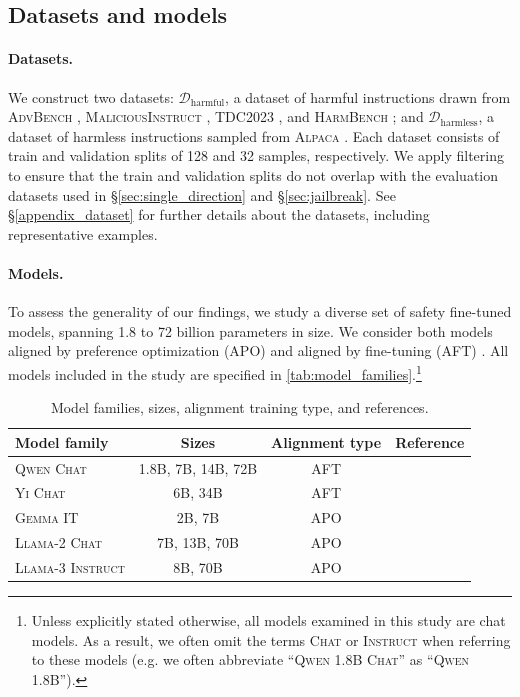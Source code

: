 \documentclass{article}
\begin{document}
\subsection{Datasets and models}
\label{subsec:datasets_models}

\paragraph{Datasets.} We construct two datasets: $\mathcal{D}_{\text{harmful}}$, a dataset of harmful instructions drawn from \textsc{AdvBench} \citep{zou2023universal}, \textsc{MaliciousInstruct} \citep{huang2023catastrophic}, \textsc{TDC2023} \citep{mazeika2024harmbench, tdc2023}, and \textsc{HarmBench} \citep{mazeika2024harmbench}; and $\mathcal{D}_{\text{harmless}}$, a dataset of harmless instructions sampled from \textsc{Alpaca} \citep{alpaca}. Each dataset consists of train and validation splits of 128 and 32 samples, respectively.
We apply filtering to ensure that the train and validation splits do not overlap with the evaluation datasets used in \S\ref{sec:single_direction} and \S\ref{sec:jailbreak}. See \S\ref{appendix_dataset} for further details about the datasets, including representative examples.

\paragraph{Models.} To assess the generality of our findings, we study a diverse set of safety fine-tuned models, spanning 1.8 to 72 billion parameters in size. We consider both models aligned by preference optimization (APO) and aligned by fine-tuning (AFT) \citep{meade2024universal}.
All models included in the study are specified in \autoref{tab:model_families}.\footnote{Unless explicitly stated otherwise, all models examined in this study are chat models. As a result, we often omit the terms \textsc{Chat} or \textsc{Instruct} when referring to these models (e.g. we often abbreviate ``\textsc{Qwen 1.8B Chat}'' as ``\textsc{Qwen 1.8B}'').}

\begin{table}[h!]
\centering
\caption{Model families, sizes, alignment training type, and references.}
\label{tab:model_families}
\begin{tabularx}{0.9\textwidth}{l c c c}
\toprule
Model family & Sizes & Alignment type & Reference \\
\midrule
\textsc{Qwen Chat} & 1.8B, 7B, 14B, 72B & AFT & \citet{bai2023qwen} \\
\textsc{Yi Chat} & 6B, 34B & AFT & \citet{young2024yi} \\
\textsc{Gemma IT} & 2B, 7B & APO &  \citet{team2024gemma} \\
\textsc{Llama-2 Chat} & 7B, 13B, 70B & APO &  \citet{touvron2023llama} \\
\textsc{Llama-3 Instruct} & 8B, 70B & APO &  \citet{llama3modelcard} \\
\bottomrule
\end{tabularx}
\end{table}
\end{document}
